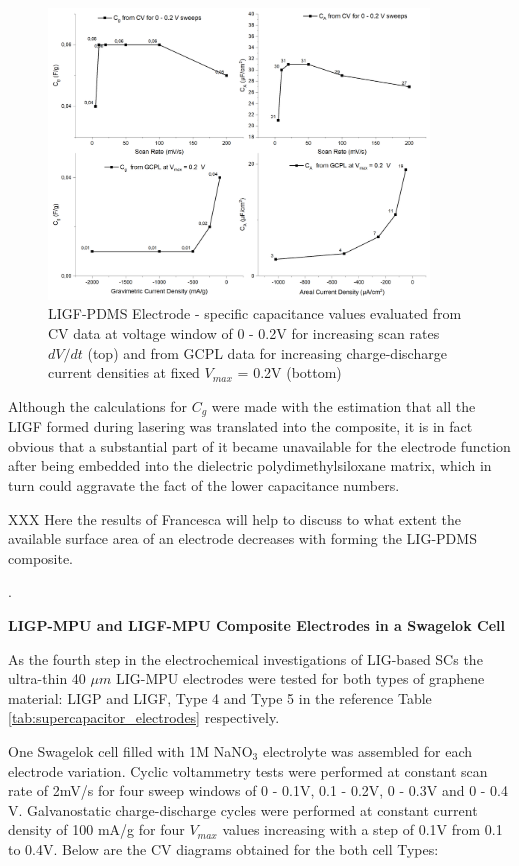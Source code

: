 \begin{figure}[H]
\centering
\includegraphics[width=0.9\textwidth]{Figures/Results/Electrochemistry/LIGF-PDMS-NaNO3-Swagelok/Cell2/Capacitances-4-PDMS.jpg}
\medskip
\captionsetup{width=1\linewidth}
\caption{LIGF-PDMS Electrode - specific capacitance values evaluated from CV data at voltage window of 0 - 0.2\:V for increasing scan rates $dV/dt$ (top) and from GCPL data for increasing charge-discharge current densities at fixed $V_{max}$ = 0.2\:V (bottom)}
\label{fig:LIGF-PDMS-capcitance-4}
\end{figure}

Although the calculations for $C_g$ were made with the estimation that all the LIGF formed during lasering was translated into the composite, it is in fact obvious that a substantial part of it became unavailable for the electrode function after being embedded into the dielectric polydimethylsiloxane matrix, which in turn could aggravate the fact of the lower capacitance numbers.

XXX Here the results of Francesca will help to discuss to what extent the available surface area of an electrode decreases with forming the LIG-PDMS composite.

.

\textbf{LIGP-MPU and LIGF-MPU Composite Electrodes in a Swagelok Cell}

As the fourth step in the electrochemical investigations of LIG-based SCs the ultra-thin 40 $\mu m$ LIG-MPU electrodes were tested for both types of graphene material: LIGP and LIGF, Type 4 and Type 5 in the reference Table \ref{tab:supercapacitor_electrodes} respectively. 

One Swagelok cell filled with 1M NaNO$_3$ electrolyte was assembled for each electrode variation. Cyclic voltammetry tests were performed at constant scan rate of 2\:mV/s for four sweep windows of 0 - 0.1\:V, 0.1 - 0.2\:V, 0 - 0.3\:V and 0 - 0.4 V. Galvanostatic charge-discharge cycles were performed at constant current density of 100 mA/g for four $V_{max}$ values increasing with a step of 0.1\:V from 0.1 to 0.4\:V. Below are the CV diagrams obtained for the both cell Types:

